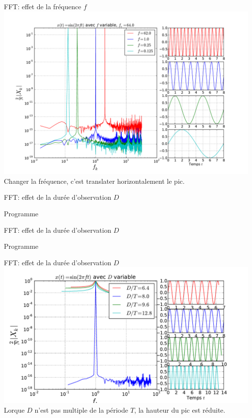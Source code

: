 \documentclass[8pt,a4paper]{beamer}
\begin{document}
\begin{frame}{FFT: effet de la fréquence $f$}
\includegraphics[width=1.\textwidth]{figures/FFT_frequence.pdf} \\
\alert{Changer la fréquence, c'est translater horizontalement le pic.}
\end{frame}



\begin{frame}{FFT: effet de la durée d'observation $D$}
\begin{block}{Programme}

\end{block}
\end{frame}
\begin{frame}{FFT: effet de la durée d'observation $D$}
\begin{block}{Programme}

\end{block}
\end{frame}

\begin{frame}{FFT: effet de la durée d'observation $D$}
\includegraphics[width=1.\textwidth]{figures/FFT_D.pdf} \\
\alert{Lorque $D$ n'est pas multiple de la période $T$, la hauteur du pic est réduite.}
\end{frame}
\end{document}
